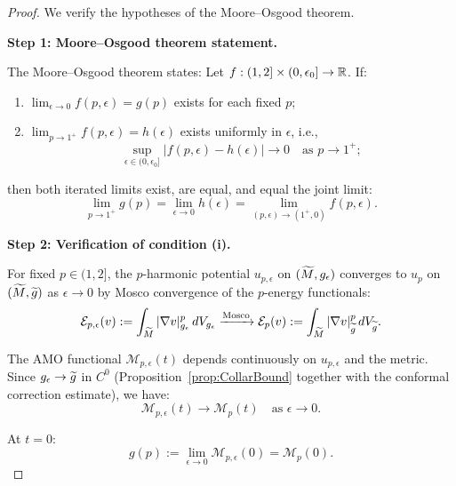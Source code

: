 \begin{proof}
We verify the hypotheses of the Moore--Osgood theorem.

\textbf{Step 1: Moore--Osgood theorem statement.}

The Moore--Osgood theorem states: Let $f: (1, 2] \times (0, \epsilon_0] \to \mathbb{R}$. If:
\begin{enumerate}
    \item[(i)] $\lim_{\epsilon \to 0} f(p, \epsilon) = g(p)$ exists for each fixed $p$;
    \item[(ii)] $\lim_{p \to 1^+} f(p, \epsilon) = h(\epsilon)$ exists uniformly in $\epsilon$, i.e., 
    \begin{equation}
        \sup_{\epsilon \in (0, \epsilon_0]} |f(p, \epsilon) - h(\epsilon)| \to 0 \quad \text{as } p \to 1^+;
    \end{equation}
\end{enumerate}
then both iterated limits exist, are equal, and equal the joint limit:
\begin{equation}
    \lim_{p \to 1^+} g(p) = \lim_{\epsilon \to 0} h(\epsilon) = \lim_{(p,\epsilon) \to (1^+, 0)} f(p, \epsilon).
\end{equation}

\textbf{Step 2: Verification of condition (i).}

For fixed $p \in (1, 2]$, the $p$-harmonic potential $u_{p,\epsilon}$ on $(\widetilde{M}, g_{\epsilon})$ converges to $u_p$ on $(\widetilde{M}, \widetilde{g})$ as $\epsilon \to 0$ by Mosco convergence of the $p$-energy functionals:
\begin{equation}
    \mathcal{E}_{p,\epsilon}(v) := \int_{\widetilde{M}} |\nabla v|^p_{g_{\epsilon}} \, dV_{g_{\epsilon}} \xrightarrow{\text{Mosco}} \mathcal{E}_p(v) := \int_{\widetilde{M}} |\nabla v|^p_{\widetilde{g}} \, dV_{\widetilde{g}}.
\end{equation}

The AMO functional $\mathcal{M}_{p,\epsilon}(t)$ depends continuously on $u_{p,\epsilon}$ and the metric. Since $g_{\epsilon} \to \widetilde{g}$ in $C^0$ (Proposition~\ref{prop:CollarBound} together with the conformal correction estimate), we have:
\begin{equation}
    \mathcal{M}_{p,\epsilon}(t) \to \mathcal{M}_p(t) \quad \text{as } \epsilon \to 0.
\end{equation}

At $t = 0$:
\begin{equation}
    g(p) := \lim_{\epsilon \to 0} \mathcal{M}_{p,\epsilon}(0) = \mathcal{M}_p(0).
\end{equation}


\end{proof}
